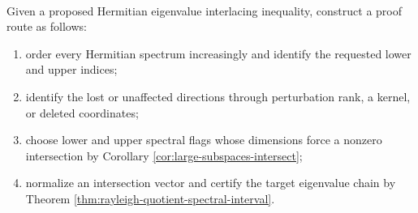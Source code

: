 \begin{proofmethod} \label{meth:eigenvalue-interlacing-method} \\
Given a proposed Hermitian eigenvalue interlacing inequality, construct a proof route as follows:
\begin{enumerate}[label=(\roman*)]
\setlength{\itemsep}{0pt}
\item order every Hermitian spectrum increasingly and identify the requested lower and upper indices;
\item identify the lost or unaffected directions through perturbation rank, a kernel, or deleted coordinates;
\item choose lower and upper spectral flags whose dimensions force a nonzero intersection by Corollary \ref{cor:large-subspaces-intersect};
\item normalize an intersection vector and certify the target eigenvalue chain by Theorem \ref{thm:rayleigh-quotient-spectral-interval}.
\end{enumerate}
\end{proofmethod}
